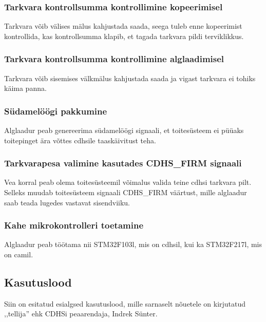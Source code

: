 \documentclass[12pt,a4paper]{article}
\begin{document}
\subsubsection{Tarkvara kontrollsumma kontrollimine kopeerimisel}
Tarkvara võib välises mälus kahjustada saada, seega tuleb enne kopeerimist
kontrollida, kas kontrollsumma klapib, et tagada tarkvara pildi terviklikkus.

\subsubsection{Tarkvara kontrollsumma kontrollimine alglaadimisel}
Tarkvara võib sisemises välkmälus kahjustada saada ja vigast tarkvara ei tohiks
käima panna.

\subsubsection{Südamelöögi pakkumine}
Alglaadur peab genereerima südamelöögi signaali, et toitesüsteem ei püüaks
toitepinget ära võttes \gls{cdhs}ile taaskäivitust teha.

\subsubsection{Tarkvarapesa valimine kasutades CDHS\_FIRM signaali}
Vea korral peab olema toitesüsteemil võimalus valida teine \gls{cdhs}i tarkvara pilt.
Selleks muudab toitesüsteem signaali CDHS\_FIRM väärtust, mille alglaadur saab
teada lugedes vastavat sisendviiku.

\subsubsection{Kahe mikrokontrolleri toetamine}
Alglaadur peab töötama nii STM32F103l, mis on \gls{cdhs}il, kui ka
STM32F217l, mis on \gls{cam}il.

\subsection{Kasutuslood}
Siin on esitatud esialgsed kasutuslood, mille sarnaselt nõuetele on kirjutatud
,,tellija'' ehk CDHSi peaarendaja, Indrek Sünter.
\end{document}
